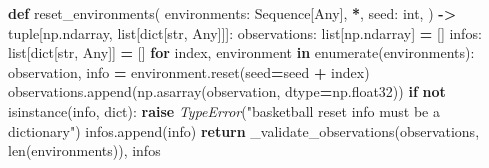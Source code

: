 \documentclass[
  american,
  11pt,
  letterpaper,
]{article}
\newenvironment{Shaded}{\begin{snugshade}}{\end{snugshade}}
\newcommand{\BuiltInTok}[1]{#1}
\newcommand{\ControlFlowTok}[1]{\textcolor[rgb]{0.13,0.29,0.53}{\textbf{#1}}}
\newcommand{\KeywordTok}[1]{\textcolor[rgb]{0.13,0.29,0.53}{\textbf{#1}}}
\newcommand{\NormalTok}[1]{#1}
\newcommand{\OperatorTok}[1]{\textcolor[rgb]{0.81,0.36,0.00}{\textbf{#1}}}
\newcommand{\PreprocessorTok}[1]{\textcolor[rgb]{0.56,0.35,0.01}{\textit{#1}}}
\newcommand{\StringTok}[1]{\textcolor[rgb]{0.31,0.60,0.02}{#1}}
\renewenvironment{Shaded}{\par\smallskip}{\par\smallskip}
\begin{document}
\begin{Shaded}
\begin{Highlighting}[]
\KeywordTok{def}\NormalTok{ reset\_environments(}
\NormalTok{    environments: Sequence[Any],}
    \OperatorTok{*}\NormalTok{,}
\NormalTok{    seed: }\BuiltInTok{int}\NormalTok{,}
\NormalTok{) }\OperatorTok{{-}\textgreater{}} \BuiltInTok{tuple}\NormalTok{[np.ndarray, }\BuiltInTok{list}\NormalTok{[}\BuiltInTok{dict}\NormalTok{[}\BuiltInTok{str}\NormalTok{, Any]]]:}
\NormalTok{    observations: }\BuiltInTok{list}\NormalTok{[np.ndarray] }\OperatorTok{=}\NormalTok{ []}
\NormalTok{    infos: }\BuiltInTok{list}\NormalTok{[}\BuiltInTok{dict}\NormalTok{[}\BuiltInTok{str}\NormalTok{, Any]] }\OperatorTok{=}\NormalTok{ []}
    \ControlFlowTok{for}\NormalTok{ index, environment }\KeywordTok{in} \BuiltInTok{enumerate}\NormalTok{(environments):}
\NormalTok{        observation, info }\OperatorTok{=}\NormalTok{ environment.reset(seed}\OperatorTok{=}\NormalTok{seed }\OperatorTok{+}\NormalTok{ index)}
\NormalTok{        observations.append(np.asarray(observation, dtype}\OperatorTok{=}\NormalTok{np.float32))}
        \ControlFlowTok{if} \KeywordTok{not} \BuiltInTok{isinstance}\NormalTok{(info, }\BuiltInTok{dict}\NormalTok{):}
            \ControlFlowTok{raise} \PreprocessorTok{TypeError}\NormalTok{(}\StringTok{"basketball reset info must be a dictionary"}\NormalTok{)}
\NormalTok{        infos.append(info)}
    \ControlFlowTok{return}\NormalTok{ \_validate\_observations(observations, }\BuiltInTok{len}\NormalTok{(environments)), infos}



\end{Highlighting}
\end{Shaded}
\end{document}

